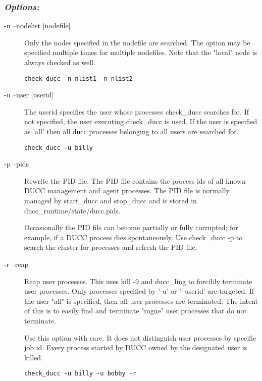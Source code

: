      \subsubsection{\em{Options:}}
         \begin{description}
           \item[-n --nodelist {[nodefile]}]
             Only the nodes specified in the nodefile are searched. The option may be specified 
             multiple times for multiple nodefiles. Note that the "local" node is always checked as well. 
\begin{verbatim}
check_ducc -n nlist1 -n nlist2 
\end{verbatim}
             
           \item[-u --user {[userid]}]
             The userid specifies the user whose processes check\_ducc searches for. If not specified, the 
             user executing check\_ducc is used. If the user is specified as 'all' then all ducc processes 
             belonging to all users are searched for. 
\begin{verbatim}
check_ducc -u billy 
\end{verbatim}
               
           \item[-p --pids]
               
               Rewrite the PID file. The PID file contains the process ids of all known DUCC 
               management and agent processes. The PID file is normally managed by start\_ducc and 
               stop\_ducc and is stored in ducc\_runtime/state/ducc.pids. 
               
               Occasionally the PID file can become partially or fully corrupted; for example, if a DUCC 
               process dies spontaneously. Use check\_ducc -p to search the cluster for processes and 
               refresh the PID file. 
               
             \item[-r --reap]

               Reap user processes. This uses kill -9 and ducc\_ling to forcibly terminate user processes. 
               Only processes specified by '-u' or '--userid' are targeted. If the user "all" is specified, then 
               all user processes are terminated. The intent of this is to easily find and terminate "rogue" 
               user processes that do not terminate. 
               
               Use this option with care. It does not distinguish user processes by specific job id. Every 
               process started by DUCC owned by the designated user is killed. 

\begin{verbatim}
check_ducc -u billy -u bobby -r 
\end{verbatim}
           \end{description}               
       
